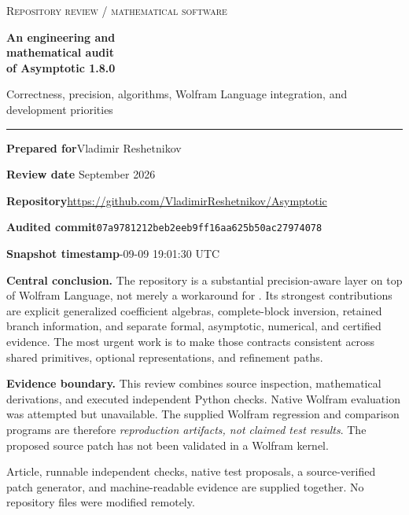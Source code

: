 \documentclass[11pt,a4paper]{article}
\newcommand{\code}[1]{\texttt{\detokenize{#1}}}
\newcommand{\snapshot}{\texttt{07a9781212beb2eeb9ff16aa625b50ac27974078}}
\theoremstyle{definition}
\begin{document}
\begin{titlepage}
\vspace*{15mm}
{\color{accent}\Large\textsc{Repository review / mathematical software}}\par
\vspace{9mm}
{\Huge\bfseries An engineering and\\[3pt] mathematical audit\\[3pt] of Asymptotic 1.8.0}\par
\vspace{7mm}
{\Large Correctness, precision, algorithms, Wolfram Language integration, and development priorities}\par
\vspace{12mm}
{\color{accent}\rule{\linewidth}{1pt}}\par
\vspace{5mm}
\textbf{Prepared for}\quad Vladimir Reshetnikov\par
\textbf{Review date} September 2026\par
\textbf{Repository}\quad\url{https://github.com/VladimirReshetnikov/Asymptotic}\par
\textbf{Audited commit}\quad\snapshot\par
\textbf{Snapshot timestamp}-09-09 19:01:30 UTC\par
\vspace{10mm}
\begin{minipage}{0.94\linewidth}
\textbf{Central conclusion.} The repository is a substantial precision-aware layer on top of Wolfram Language, not merely a workaround for \code{InverseSeries}. Its strongest contributions are explicit generalized coefficient algebras, complete-block inversion, retained branch information, and separate formal, asymptotic, numerical, and certified evidence. The most urgent work is to make those contracts consistent across shared primitives, optional representations, and refinement paths.\par
\vspace{4mm}
\textbf{Evidence boundary.} This review combines source inspection, mathematical derivations, and executed independent Python checks. Native Wolfram evaluation was attempted but unavailable. The supplied Wolfram regression and comparison programs are therefore \emph{reproduction artifacts, not claimed test results}. The proposed source patch has not been validated in a Wolfram kernel.
\end{minipage}
\vfill
{\small Article, runnable independent checks, native test proposals, a source-verified patch generator, and machine-readable evidence are supplied together. No repository files were modified remotely.}
\end{titlepage}
\end{document}
